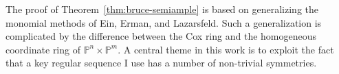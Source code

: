 \documentclass[11pt,reqno]{amsart}
\newtheorem{question}[lemma]{Question}
\theoremstyle{remark}
\renewcommand{\O}{\mathcal{O}}
\newcommand{\N}{\mathbb{N}}
\renewcommand{\P}{\mathbb{P}}
\begin{document}


The proof of Theorem~\ref{thm:bruce-semiample} is based on generalizing the monomial methods of Ein, Erman, and Lazarsfeld. Such a generalization is complicated by the difference between the Cox ring and the homogeneous coordinate ring of $\P^{n}\times\P^{m}$. A central theme in this work is to exploit the fact that a key regular sequence I use has a number of non-trivial symmetries. 

%
%
\end{document}
